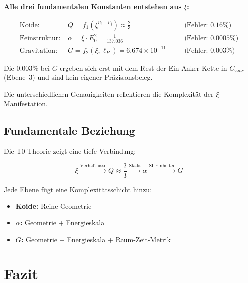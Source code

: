 	\begin{folgerung}
		\textbf{Alle drei fundamentalen Konstanten entstehen aus $\xi$:}
		
		\begin{align}
			\text{Koide: } & Q = f_1(\xi^{p_i - p_j}) \approx \frac{2}{3} \quad &&\text{(Fehler: } 0.16\%) \\
			\text{Feinstruktur: } & \alpha = \xi \cdot E_0^2 = \frac{1}{137.036} \quad &&\text{(Fehler: } 0.0005\%) \\
			\text{Gravitation: } & G = f_2(\xi, \ell_P) = 6.674 \times 10^{-11} \quad &&\text{(Fehler: } 0.003\%)
		\end{align}
		
		Die $0.003\%$ bei $G$ ergeben sich erst mit dem Rest der Ein-Anker-Kette in $C_{\text{conv}}$ (Ebene~3) und sind kein eigener Präzisionsbeleg.
		
		Die unterschiedlichen Genauigkeiten reflektieren die Komplexität der $\xi$-Manifestation.
	\end{folgerung}
	
	\subsection{Fundamentale Beziehung}
	
	Die T0-Theorie zeigt eine tiefe Verbindung:
	
	\begin{equation}
		\boxed{\xi \xrightarrow{\text{Verhältnisse}} Q \approx \frac{2}{3} \xrightarrow{\text{Skala}} \alpha \xrightarrow{\text{SI-Einheiten}} G}
	\end{equation}
	
	Jede Ebene fügt eine Komplexitätsschicht hinzu:
	\begin{itemize}
		\item \textbf{Koide:} Reine Geometrie
		\item \textbf{$\alpha$:} Geometrie + Energieskala
		\item \textbf{$G$:} Geometrie + Energieskala + Raum-Zeit-Metrik
	\end{itemize}
	
	\section{Fazit}
	
